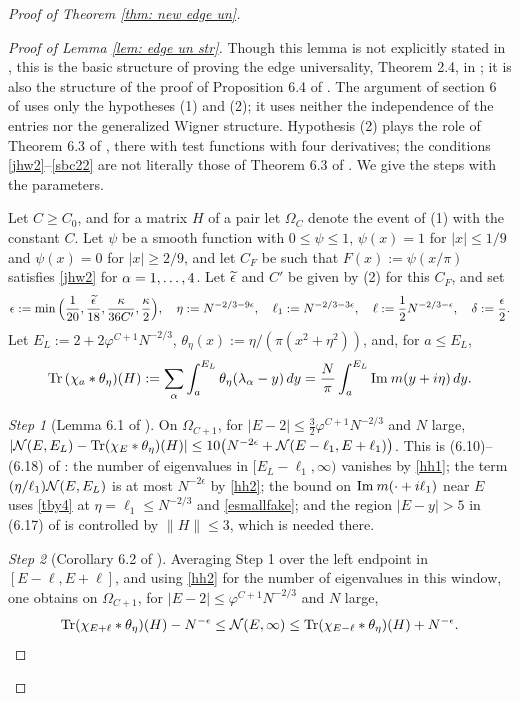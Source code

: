 \begin{proof}[Proof of Theorem \ref{thm: new edge un}]
\begin{proof}[Proof of Lemma \ref{lem: edge un str}]
Though this lemma is not explicitly stated in \cite{EYY}, this is the basic structure of proving the edge universality, Theorem 2.4, in \cite{EYY}; it is also the structure of the proof of Proposition 6.4 of \cite{EKYY2}. The argument of section 6 of \cite{EYY} uses only the hypotheses (1) and (2); it uses neither the independence of the entries nor the generalized Wigner structure. Hypothesis (2) plays the role of Theorem 6.3 of \cite{EYY}, there with test functions with four derivatives; the conditions \eqref{jhw2}--\eqref{sbc22} are not literally those of Theorem 6.3 of \cite{EYY}. We give the steps with the parameters.

Let $C\ge C_0$, and for a matrix $H$ of a pair let $\Omega_{C}$ denote the event of (1) with the constant $C$. Let $\psi$ be a smooth function with $0\le\psi\le1$, $\psi(x)=1$ for $|x|\le1/9$ and $\psi(x)=0$ for $|x|\ge2/9$, and let $C_F$ be such that $F(x):=\psi(x/\pi)$ satisfies \eqref{jhw2} for $\alpha=1,\dots,4$. Let $\widetilde\epsilon$ and $C'$ be given by (2) for this $C_F$, and set
$$
\epsilon:=\min\Big(\frac1{20},\frac{\widetilde\epsilon}{18},\frac{\kappa}{36C'},\frac\kappa2\Big),\quad \eta:=N^{-2/3-9\epsilon},\quad \ell_1:=N^{-2/3-3\epsilon},\quad \ell:=\frac12N^{-2/3-\epsilon},\quad \delta:=\frac\epsilon2 .
$$
Let $E_L:=2+2\varphi^{C+1}N^{-2/3}$, $\theta_\eta(x):=\eta/(\pi(x^2+\eta^2))$, and, for $a\le E_L$,
$$
{\rm Tr}\,(\chi_a*\theta_\eta)(H):=\sum_\alpha\int_a^{E_L}\theta_\eta(\lambda_\alpha-y)\,dy=\frac N\pi\int_a^{E_L}\mathrm{Im}\: m(y+i\eta)\,dy .
$$

{\it Step 1} (Lemma 6.1 of \cite{EYY}). On $\Omega_{C+1}$, for $|E-2|\le\frac32\varphi^{C+1}N^{-2/3}$ and $N$ large, $|\mathcal{N}(E,E_L)-{\rm Tr}(\chi_E*\theta_\eta)(H)|\le10\big(N^{-2\epsilon}+\mathcal{N}(E-\ell_1,E+\ell_1)\big)$. This is (6.10)--(6.18) of \cite{EYY}: the number of eigenvalues in $[E_L-\ell_1,\infty)$ vanishes by \eqref{hh1}; the term $(\eta/\ell_1)\mathcal{N}(E,E_L)$ is at most $N^{-2\epsilon}$ by \eqref{hh2}; the bound on $\mathrm{Im}\: m(\cdot+i\ell_1)$ near $E$ uses \eqref{tby4} at $\eta=\ell_1\le N^{-2/3}$ and \eqref{esmallfake}; and the region $|E-y|>5$ in (6.17) of \cite{EYY} is controlled by $\|H\|\le3$, which is needed there.

{\it Step 2} (Corollary 6.2 of \cite{EYY}). Averaging Step 1 over the left endpoint in $[E-\ell,E+\ell]$, and using \eqref{hh2} for the number of eigenvalues in this window, one obtains on $\Omega_{C+1}$, for $|E-2|\le\varphi^{C+1}N^{-2/3}$ and $N$ large,
$$
{\rm Tr}(\chi_{E+\ell}*\theta_\eta)(H)-N^{-\epsilon}\le\mathcal{N}(E,\infty)\le{\rm Tr}(\chi_{E-\ell}*\theta_\eta)(H)+N^{-\epsilon}.
$$


\end{proof}
\end{proof}
